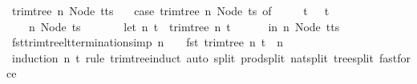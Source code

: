 \begin{isabellebody}
{\isacharbar}{\kern0pt}\ {\isachardoublequoteopen}trim{\isacharunderscore}{\kern0pt}tree\ n\ {\isacharparenleft}{\kern0pt}Node\ {\isacharparenleft}{\kern0pt}t{\isacharhash}{\kern0pt}ts{\isacharparenright}{\kern0pt}{\isacharparenright}{\kern0pt}\ {\isacharequal}{\kern0pt}\isanewline
\ \ {\isacharparenleft}{\kern0pt}case\ trim{\isacharunderscore}{\kern0pt}tree\ n\ {\isacharparenleft}{\kern0pt}Node\ ts{\isacharparenright}{\kern0pt}\ of\isanewline
\ \ \ \ {\isacharparenleft}{\kern0pt}{}{\isacharcomma}{\kern0pt}\ t{\isacharprime}{\kern0pt}{\isacharparenright}{\kern0pt}\ {\isasymRightarrow}\ {\isacharparenleft}{\kern0pt}{}{\isacharcomma}{\kern0pt}\ t{\isacharprime}{\kern0pt}{\isacharparenright}{\kern0pt}\ {\isacharbar}{\kern0pt}\isanewline
\ \ \ \ {\isacharparenleft}{\kern0pt}n{}{\isacharcomma}{\kern0pt}\ Node\ ts{\isacharprime}{\kern0pt}{\isacharparenright}{\kern0pt}\ {\isasymRightarrow}\isanewline
\ \ \ \ \ \ let\ {\isacharparenleft}{\kern0pt}n{}{\isacharcomma}{\kern0pt}\ t{\isacharprime}{\kern0pt}{\isacharparenright}{\kern0pt}\ {\isacharequal}{\kern0pt}\ trim{\isacharunderscore}{\kern0pt}tree\ n{}\ t\isanewline
\ \ \ \ \ \ in\ {\isacharparenleft}{\kern0pt}n{}{\isacharcomma}{\kern0pt}\ Node\ {\isacharparenleft}{\kern0pt}t{\isacharprime}{\kern0pt}{\isacharhash}{\kern0pt}ts{\isacharprime}{\kern0pt}{\isacharparenright}{\kern0pt}{\isacharparenright}{\kern0pt}{\isacharparenright}{\kern0pt}{\isachardoublequoteclose}\isanewline
\isanewline
{}\isamarkupfalse%
\ fst{\isacharunderscore}{\kern0pt}trim{\isacharunderscore}{\kern0pt}tree{\isacharunderscore}{\kern0pt}lt{\isacharbrackleft}{\kern0pt}termination{\isacharunderscore}{\kern0pt}simp{\isacharbrackright}{\kern0pt}{\isacharcolon}{\kern0pt}\ {\isachardoublequoteopen}n\ {\isasymnoteq}\ {}\ {\isasymLongrightarrow}\ fst\ {\isacharparenleft}{\kern0pt}trim{\isacharunderscore}{\kern0pt}tree\ n\ t{\isacharparenright}{\kern0pt}\ {\isacharless}{\kern0pt}\ n{\isachardoublequoteclose}\isanewline
%
\isadelimproof
\ \ %
\endisadelimproof
%
\isatagproof
{}\isamarkupfalse%
\ {\isacharparenleft}{\kern0pt}induction\ n\ t\ rule{\isacharcolon}{\kern0pt}\ trim{\isacharunderscore}{\kern0pt}tree{\isachardot}{\kern0pt}induct{\isacharcomma}{\kern0pt}\ auto\ split{\isacharcolon}{\kern0pt}\ prod{\isachardot}{\kern0pt}split\ nat{\isachardot}{\kern0pt}split\ tree{\isachardot}{\kern0pt}split{\isacharcomma}{\kern0pt}\ fastforce{\isacharparenright}{\kern0pt}%
\endisatagproof
{\isafoldproof}%
%
\isadelimproof
\isanewline
%
\endisadelimproof

\end{isabellebody}
